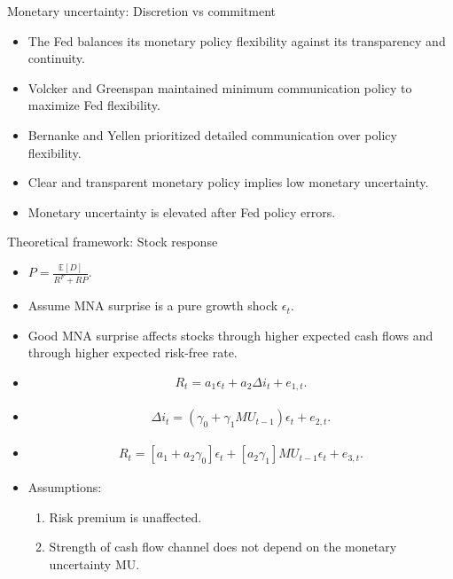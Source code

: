 \documentclass{beamer}
\begin{document}
\begin{frame}{Monetary uncertainty: Discretion vs commitment}
    \begin{itemize}
        \item The Fed balances its monetary policy flexibility against its transparency and continuity.
        \item Volcker and Greenspan maintained minimum communication policy to maximize Fed flexibility.
        \item Bernanke and Yellen prioritized detailed communication over policy flexibility.
        \item Clear and transparent monetary policy implies low monetary uncertainty.
        \item Monetary uncertainty is elevated after Fed policy errors. 
    \end{itemize}  
\end{frame}





\begin{frame}{Theoretical framework: Stock response}
    \begin{itemize}
    \abovedisplayskip=-\baselineskip
    \belowdisplayskip=0pt
    \abovedisplayshortskip=-\baselineskip
    \belowdisplayshortskip=0pt
        \item {$P = \frac{\mathbb{E}[D]}{R^F + RP}.$}
        \item {Assume MNA surprise is a pure growth shock $\epsilon_t$.}
        \item {Good MNA surprise affects stocks through higher expected cash flows and through higher expected risk-free rate.}
        \item 
        \begin{align}
        R_t = a_1 \epsilon_{t} + a_2 \Delta i_t + e_{1,t}.
        \end{align}
        \item 
        \begin{align}
        \Delta i_t = (\gamma_0 + \gamma_1 MU_{t-1})\epsilon_{t}+e_{2,t}.
        \end{align}
        \item 
        \begin{align}
        R_t = [a_1+a_2\gamma_0] \epsilon_{t} + [a_2 \gamma_1] MU_{t-1}\epsilon_{t} + e_{3,t}.
        \end{align}
        \item{Assumptions:}
        \begin{enumerate}
            \item {Risk premium is unaffected.}
            \item {Strength of cash flow channel does not depend on the monetary uncertainty MU.}
        \end{enumerate}
    \end{itemize}
\end{frame}
\end{document}
